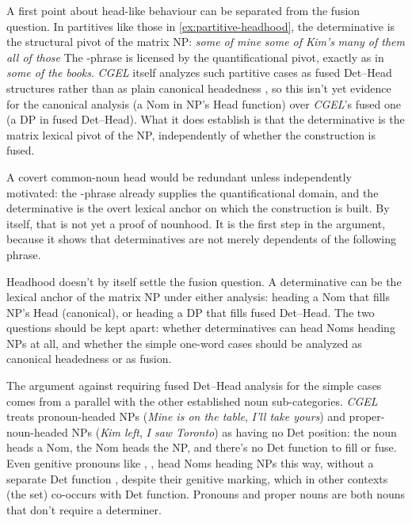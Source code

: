 \documentclass[12pt]{article}
\begin{document}
A first point about head-like behaviour can be separated from the fusion question. In partitives like those in \ref{ex:partitive-headhood}, the determinative is the structural pivot of the matrix NP:
\ea\label{ex:partitive-headhood}
\ea \textit{some of mine}
\ex \textit{some of Kim's}
\ex \textit{many of them}
\ex \textit{all of those}
\z
\z
The -phrase is licensed by the quantificational pivot, exactly as in \textit{some of the books}. \textit{CGEL} itself analyzes such partitive cases as fused Det--Head structures rather than as plain canonical headedness \citep[Ch.~5 §9]{huddleston2002}, so this isn't yet evidence for the canonical analysis (a Nom in NP's Head function) over \textit{CGEL}'s fused one (a DP in fused Det--Head). What it does establish is that the determinative is the matrix lexical pivot of the NP, independently of whether the construction is fused.

A covert common-noun head would be redundant unless independently motivated: the -phrase already supplies the quantificational domain, and the determinative is the overt lexical anchor on which the construction is built. By itself, that is not yet a proof of nounhood. It is the first step in the argument, because it shows that determinatives are not merely dependents of the following phrase.

Headhood doesn't by itself settle the fusion question. A determinative can be the lexical anchor of the matrix NP under either analysis: heading a Nom that fills NP's Head (canonical), or heading a DP that fills fused Det--Head. The two questions should be kept apart: whether determinatives can head Noms heading NPs at all, and whether the simple one-word cases should be analyzed as canonical headedness or as fusion.

The argument against requiring fused Det--Head analysis for the simple cases comes from a parallel with the other established noun sub-categories. \textit{CGEL} treats pronoun-headed NPs (\textit{Mine is on the table}, \textit{I'll take yours}) and proper-noun-headed NPs (\textit{Kim left}, \textit{I saw Toronto}) as having no Det position: the noun heads a Nom, the Nom heads the NP, and there's no Det function to fill or fuse. Even genitive pronouns like , ,  head Noms heading NPs this way, without a separate Det function \citep[411]{huddleston2002}, despite their genitive marking, which in other contexts (the  set) co-occurs with Det function. Pronouns and proper nouns are both nouns that don't require a determiner.
\end{document}
